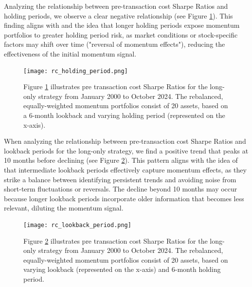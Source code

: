 \documentclass[a4paper,12pt]{article}
\begin{document}
    Analyzing the relationship between pre-transaction cost Sharpe Ratios and holding periods, we observe a clear negative relationship (see Figure \ref{fig_02}). This finding aligns with \cite{jegatit1993} and the idea that longer holding periods expose momentum portfolios to greater holding period risk, as market conditions or stock-specific factors may shift over time ("reversal of momentum effects"), reducing the effectiveness of the initial momentum signal. 
    \begin{figure}[htbp]
    \centerline{\texttt{[image: rc\_holding\_period.png]}}
    \caption{}
    \label{fig_02}
    \small{{Figure \ref{fig_02} illustrates pre transaction cost Sharpe Ratios for the long-only strategy from January 2000 to October 2024. The rebalanced, equally-weighted momentum portfolios consist of 20 assets, based on a 6-month lookback and varying holding period (represented on the x-axis).}}
    \end{figure}
    
    When analyzing the relationship between pre-transaction cost Sharpe Ratios and lookback periods for the long-only strategy, we find a positive trend that peaks at 10 months before declining (see Figure \ref{fig_03}). This pattern aligns with the idea of \cite{jegatit1993} that intermediate lookback periods effectively capture momentum effects, as they strike a balance between identifying persistent trends and avoiding noise from short-term fluctuations or reversals. The decline beyond 10 months may occur because longer lookback periods incorporate older information that becomes less relevant, diluting the momentum signal.
    
    \begin{figure}[htbp]
    \centerline{\texttt{[image: rc\_lookback\_period.png]}}
    \caption{}
    \label{fig_03}
    \small{{Figure \ref{fig_03} illustrates pre transaction cost Sharpe Ratios for the long-only strategy from January 2000 to October 2024. The rebalanced, equally-weighted momentum portfolios consist of 20 assets, based on varying lookback (represented on the x-axis) and 6-month holding period.}}
    \end{figure}
    
\end{document}
